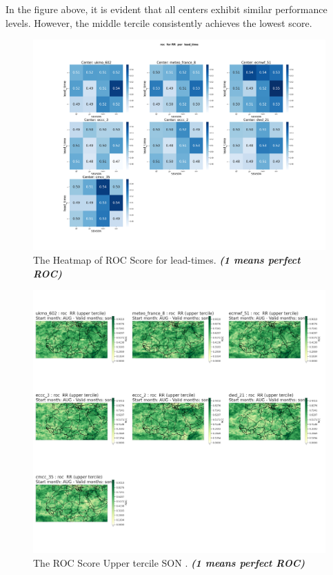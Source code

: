 In the figure above, it is evident that all centers exhibit similar performance levels. However, the middle tercile consistently achieves the lowest score.
\begin{figure}[H]
    \centering
    \includegraphics[scale=0.25]{plots/prob/roc/roc_RR_lead_time.png}
    \caption{The Heatmap of ROC Score for lead-times. \textbf{\textit{(1 means perfect ROC)}}}
\end{figure}


\begin{figure}[H]
    \centering
    \includegraphics[scale=0.3]{plots/prob/roc/roc_son_RR_upper.png}
    \caption{The ROC Score Upper tercile SON    . \textbf{\textit{(1 means perfect ROC)}}}
\end{figure}


